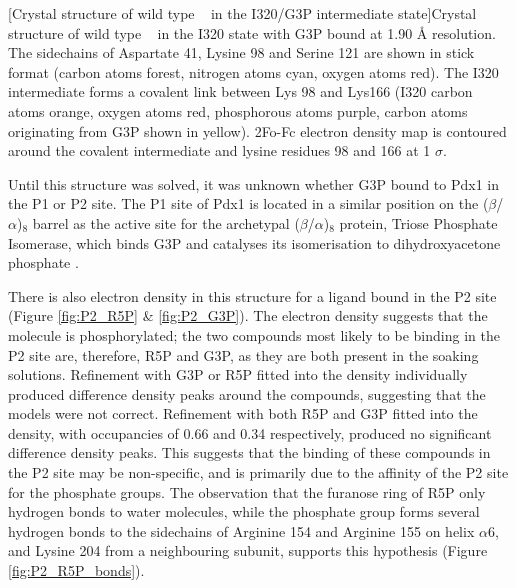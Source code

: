 \begin{minipage}{\linewidth}
	[Crystal structure of wild type \atpdx~ in the I320/G3P intermediate state]{Crystal structure of wild type \atpdx~ in the I320 state with G3P bound at 1.90 \si{\angstrom} resolution. The sidechains of Aspartate 41, Lysine 98 and Serine 121 are shown in stick format (carbon atoms forest, nitrogen atoms cyan, oxygen atoms red). The I320 intermediate forms a covalent link between Lys 98 and Lys166 (I320 carbon atoms orange, oxygen atoms red, phosphorous atoms purple, carbon atoms originating from G3P shown in yellow). 2Fo-Fc electron density map is contoured around the covalent intermediate and lysine residues 98 and 166 at 1 $\sigma$.\label{fig:Pdx1_G3P}} 		
\end{minipage}     

Until this structure was solved, it was unknown whether G3P bound to Pdx1 in the P1 or P2 site. The P1 site of Pdx1 is located in a similar position on the ($\beta$/$\alpha$)$_{8}$ barrel as the active site for the archetypal ($\beta$/$\alpha$)$_{8}$ protein, Triose Phosphate Isomerase, which binds G3P and catalyses its isomerisation to dihydroxyacetone phosphate \cite{Noble1991}. 

There is also electron density in this structure for a ligand bound in the P2 site (Figure \ref{fig:P2_R5P} \& \ref{fig:P2_G3P}). The electron density suggests that the molecule is phosphorylated; the two compounds most likely to be binding in the P2 site are, therefore, R5P and G3P, as they are both present in the soaking solutions. Refinement with G3P or R5P fitted into the density individually produced difference density peaks around the compounds, suggesting that the models were not correct. Refinement with both R5P and G3P fitted into the density, with occupancies of 0.66 and 0.34 respectively, produced no significant difference density peaks. This suggests that the binding of these compounds in the P2 site may be non-specific, and is primarily due to the affinity of the P2 site for the phosphate groups. The observation that the furanose ring of R5P only hydrogen bonds to water molecules, while the phosphate group forms several hydrogen bonds to the sidechains of Arginine 154 and Arginine 155 on helix $\alpha$6, and Lysine 204 from a neighbouring subunit, supports this hypothesis (Figure \ref{fig:P2_R5P_bonds}).         


